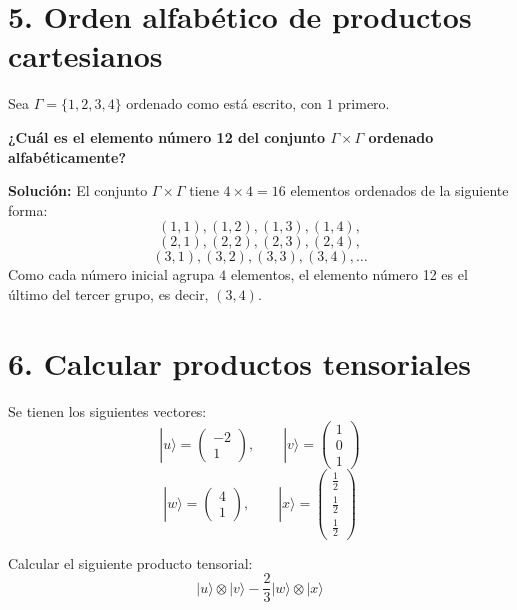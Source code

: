 \documentclass[12pt,a4paper]{article}
\begin{document}
\section{5. Orden alfabético de productos cartesianos}

Sea $\Gamma=\{1,2,3,4\}$ ordenado como está escrito, con $1$ primero.

\textbf{¿Cuál es el elemento número 12 del conjunto $\Gamma\times\Gamma$ ordenado alfabéticamente?}

\vspace{0.5em}
\textbf{Solución:}
El conjunto $\Gamma \times \Gamma$ tiene $4 \times 4 = 16$ elementos ordenados de la siguiente forma:
$$(1,1), (1,2), (1,3), (1,4),$$
$$(2,1), (2,2), (2,3), (2,4),$$
$$(3,1), (3,2), (3,3), (3,4), \dots$$
Como cada número inicial agrupa $4$ elementos, el elemento número 12 es el último del tercer grupo, es decir, \textbf{$(3,4)$}.

\section{6. Calcular productos tensoriales}

Se tienen los siguientes vectores:
$$|u\rangle= \begin{pmatrix} -2\\ 1 \end{pmatrix}, \qquad |v\rangle= \begin{pmatrix} 1\\ 0\\ 1 \end{pmatrix}$$
$$|w\rangle= \begin{pmatrix} 4\\ 1 \end{pmatrix}, \qquad |x\rangle= \begin{pmatrix} \frac{1}{2}\\ \frac{1}{2}\\ \frac{1}{2} \end{pmatrix}$$

Calcular el siguiente producto tensorial:
$$|u\rangle\otimes|v\rangle -\frac{2}{3} |w\rangle\otimes|x\rangle$$
\end{document}
